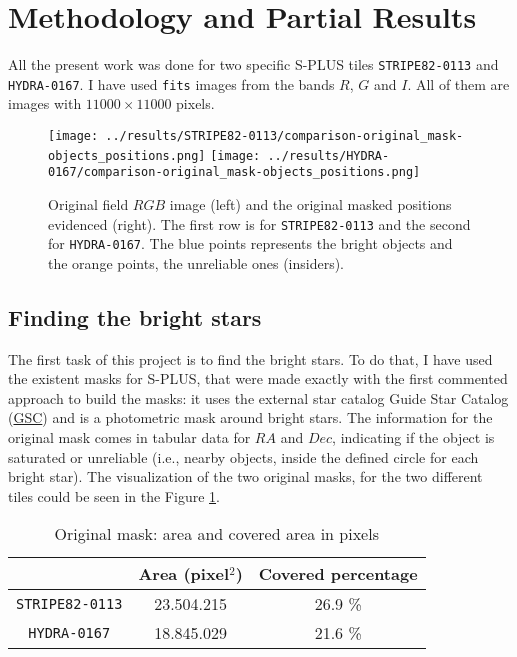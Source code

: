 \documentclass{article}
\begin{document}
\section{Methodology and Partial Results}
\label{sec:Methodology}

All the present work was done for two specific S-PLUS tiles \texttt{STRIPE82-0113} and \texttt{HYDRA-0167}. I have used \texttt{fits} images from the bands $R$, $G$ and $I$. All of them are images with $11000 \times 11000$ pixels.

\begin{figure}[h!]
  \centering
  \texttt{[image: ../results/STRIPE82-0113/comparison-original\_mask-objects\_positions.png]}
  \texttt{[image: ../results/HYDRA-0167/comparison-original\_mask-objects\_positions.png]}
  \caption{Original field $RGB$ image (left) and the original masked positions evidenced (right). The first row is for \texttt{STRIPE82-0113} and the second for \texttt{HYDRA-0167}. The blue points represents the bright objects and the orange points, the unreliable ones (insiders).}
  \label{fig:original_mask}
\end{figure}

\subsection{Finding the bright stars}

The first task of this project is to find the bright stars. To do that, I have used the existent masks for S-PLUS, that were made exactly with the first commented approach to build the masks: it uses the external star catalog Guide Star Catalog (\href{https://archive.stsci.edu/missions-and-data/dss--gsc}{GSC}) and is a photometric mask around bright stars. The information for the original mask comes in tabular data for $RA$ and $Dec$, indicating if the object is saturated or unreliable (i.e., nearby objects, inside the defined circle for each bright star). The visualization of the two original masks, for the two different tiles could be seen in the Figure \ref{fig:original_mask}.

\begin{table}[h!]
  \centering
  \caption{Original mask: area and covered area in pixels}
  \begin{tabular}{c|c|c}
    \cline{2-3}
     & {\cellcolor{orange!20}\bf Area (pixel$^2$)} & {\cellcolor{orange!20}\bf Covered percentage} \\
    \hline
    {\cellcolor{blue!20}\texttt{STRIPE82-0113}} & 23.504.215 & 26.9 \%\\
    \hline
    {\cellcolor{blue!20}\texttt{HYDRA-0167}} & 18.845.029 & 21.6 \%\\
    \hline
  \end{tabular}
  \label{tb:original_masks}
\end{table}
\end{document}
